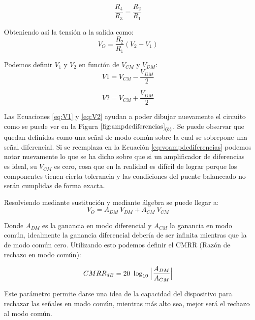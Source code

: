\documentclass[11pt, a4paper]{article}
\begin{document}
\begin{equation}
\label{eq:puentebalanceado}
	\dfrac{R_4}{R_3} = \dfrac{R_2}{R_1}
\end{equation}
	
	Obteniendo así la tensión a la salida como:
\begin{equation}
\label{eq:voampdediferencias}
V_O= \dfrac{R_2}{R_1} (V_2 - V_1)
\end{equation}	

	Podemos definir $V_1$ y $V_2$ en función de $V_{CM}$ y $V_{DM}$:
\begin{equation}
\label{eq:V1}
V1=V_{CM} - \dfrac{V_{DM}}{2}
\end{equation}

\begin{equation}
\label{eq:V2}
V2=V_{CM} + \dfrac{V_{DM}}{2}
\end{equation}
	
	Las Ecuaciones \ref{eq:V1} y \ref{eq:V2} ayudan a poder dibujar nuevamente el circuito como se puede ver en la Figura $\ref{fig:ampdediferencias}_{(b)}$.
Se puede observar que quedan definidas como una señal de modo común sobre la cual se sobrepone una señal diferencial. Si se reemplaza en la Ecuación \ref{eq:voampdediferencias} podemos notar nuevamente lo que se ha dicho sobre que si un amplificador de diferencias es ideal, su $V_{CM}$ es cero, cosa que en la realidad es difícil de lograr porque los componentes tienen cierta tolerancia y las condiciones del puente balanceado no serán cumplidas de forma exacta. 

	Resolviendo mediante sustitución y mediante álgebra se puede llegar a:
\begin{equation}
\label{eq:voconganancias}
V_O=A_{DM} \ V_{DM} + A_{CM} \ V_{CM}
\end{equation}

	Donde $A_{DM}$ es la ganancia en modo diferencial y $A_{CM}$ la ganancia en modo común, idealmente la ganancia diferencial debería de ser infinita mientras que la de modo común cero. Utilizando esto podemos definir el CMRR (Razón de rechazo en modo común):
	
\begin{equation}
\label{eq:CMRR}
	CMRR_{dB} = 20 \ \log_{10} \ \abs[\Big]{\dfrac{A_{DM}}{A_{CM}}}
\end{equation}

	Este parámetro permite darse una idea de la capacidad del dispositivo para rechazar las señales en modo común, mientras más alto sea, mejor será el rechazo al modo común.
	
\end{document}
